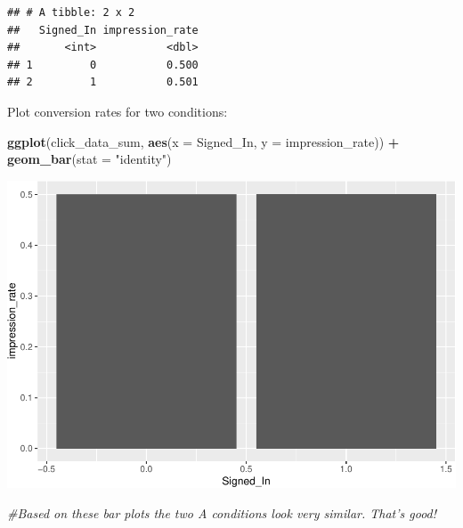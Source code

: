 \documentclass[]{book}
\newenvironment{Shaded}{\begin{snugshade}}{\end{snugshade}}
\newcommand{\CommentTok}[1]{\textcolor[rgb]{0.56,0.35,0.01}{\textit{#1}}}
\newcommand{\DataTypeTok}[1]{\textcolor[rgb]{0.13,0.29,0.53}{#1}}
\newcommand{\DecValTok}[1]{\textcolor[rgb]{0.00,0.00,0.81}{#1}}
\newcommand{\KeywordTok}[1]{\textcolor[rgb]{0.13,0.29,0.53}{\textbf{#1}}}
\newcommand{\NormalTok}[1]{#1}
\newcommand{\OperatorTok}[1]{\textcolor[rgb]{0.81,0.36,0.00}{\textbf{#1}}}
\newcommand{\StringTok}[1]{\textcolor[rgb]{0.31,0.60,0.02}{#1}}
\begin{document}
\begin{Shaded}
\end{Shaded}

\begin{verbatim}
## # A tibble: 2 x 2
##   Signed_In impression_rate
##       <int>           <dbl>
## 1         0           0.500
## 2         1           0.501
\end{verbatim}

Plot conversion rates for two conditions:

\begin{Shaded}
\begin{Highlighting}[]
\KeywordTok{ggplot}\NormalTok{(click_data_sum,}
       \KeywordTok{aes}\NormalTok{(}\DataTypeTok{x =}\NormalTok{ Signed_In, }\DataTypeTok{y =}\NormalTok{ impression_rate)) }\OperatorTok{+}
\StringTok{  }\KeywordTok{geom_bar}\NormalTok{(}\DataTypeTok{stat =} \StringTok{"identity"}\NormalTok{)  }
\end{Highlighting}
\end{Shaded}

\includegraphics{code4stem_files/figure-latex/plot conversion rates-1.pdf}

\begin{Shaded}
\begin{Highlighting}[]
\CommentTok{#Based on these bar plots the two A conditions look very similar. That's good!}
\end{Highlighting}
\end{Shaded}
\end{document}
